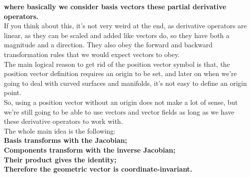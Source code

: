\textbf{where basically we consider basis vectors these partial derivative operators.}\\
If you think about this, it's not very weird at the end, as derivative operators are linear, as they can be scaled and added like vectors do, 
so they have both a magnitude and a direction.
They also obey the forward and backward transformation rules that we would expect vectors to obey.\\

The main logical reason to get rid of the position vector symbol is that, the position vector definition requires an origin to be set, and 
later on when we're going to deal with curved surfaces and manifolds, it's not easy to define an origin point.\\
So, using a position vector without an origin does not make a lot of sense, but we're still going to be able to use
vectors and vector fields as long as we have these derivative operators to work with.\\

The whole main idea is the following:\\
\textbf{Basis transforms with the Jacobian;\\
Components transform with the inverse Jacobian;\\
Their product gives the identity;\\
Therefore the geometric vector is coordinate-invariant.}


